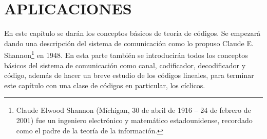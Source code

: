 \chapter{APLICACIONES}
En este capítulo se darán los conceptos básicos de teoría de códigos. Se empezará dando una descripción del sistema de comunicación como lo propuso Claude E. Shannon\footnote{Claude Elwood Shannon (Míchigan, 30 de abril de 1916 -- 24 de febrero de 2001) fue un ingeniero electrónico y matemático estadounidense, recordado como el padre de la teoría de la información.} en 1948. En esta parte también se introducirán todos los conceptos básicos del sistema de comunicación como canal, codificador, decodificador y código, además de hacer un breve estudio de los códigos lineales, para terminar este capítulo con una clase de códigos en particular, los cíclicos. 

